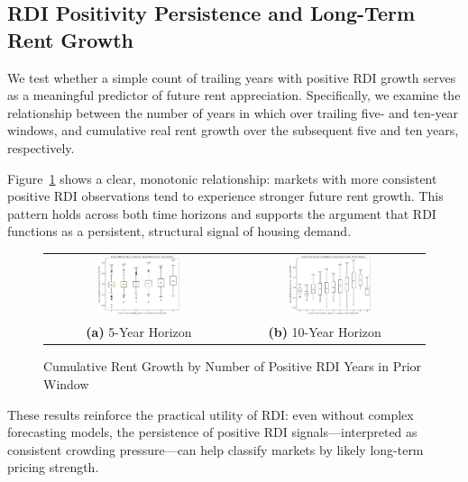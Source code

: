 \documentclass[APA,Times1COL]{WileyNJDv5} %
\begin{document}
\subsection{RDI Positivity Persistence and Long-Term Rent Growth}
We test whether a simple count of trailing years with positive RDI growth serves as a meaningful predictor of future rent appreciation. Specifically, we examine the relationship between the number of years in which  over trailing five- and ten-year windows, and cumulative real rent growth over the subsequent five and ten years, respectively.

Figure~\ref{fig:rdi-counts} shows a clear, monotonic relationship: markets with more consistent positive RDI observations tend to experience stronger future rent growth. This pattern holds across both time horizons and supports the argument that RDI functions as a persistent, structural signal of housing demand.

\begin{figure}[h]
	\centering
	\begin{tabular}{cc}
		\includegraphics[width=0.45\textwidth]{rdi_positive_counts_vs_rent_growth_5yr.pdf} &
		\includegraphics[width=0.45\textwidth]{rdi_positive_counts_vs_rent_growth_10yr.pdf} \\
		\textbf{(a)} 5-Year Horizon & \textbf{(b)} 10-Year Horizon \
	\end{tabular}
	\caption{Cumulative Rent Growth by Number of Positive RDI Years in Prior Window}
	\label{fig:rdi-counts}
\end{figure}

These results reinforce the practical utility of RDI: even without complex forecasting models, the persistence of positive RDI signals—interpreted as consistent crowding pressure—can help classify markets by likely long-term pricing strength.
\end{document}
